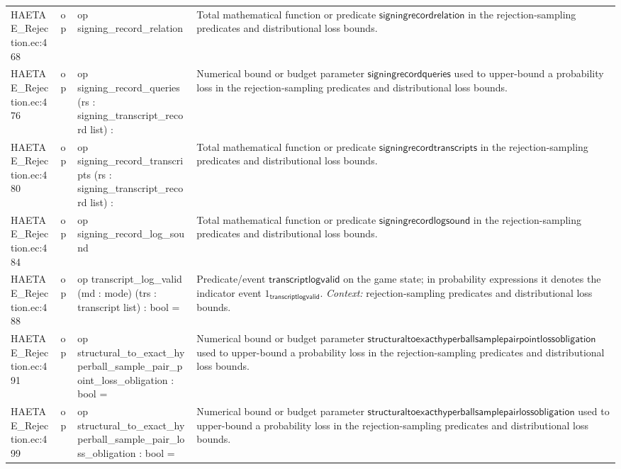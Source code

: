 \documentclass[10pt]{article}
\begin{document}
\begin{longtable}{L{0.11\textwidth}L{0.055\textwidth}L{0.385\textwidth}L{0.41\textwidth}}
HAETAE\_\allowbreak{}Rejection.\allowbreak{}ec:\allowbreak{}468 & op & {\ttfamily\scriptsize op signing\_\allowbreak{}record\_\allowbreak{}relation} & Total mathematical function or predicate $\mathsf{signingrecordrelation}$ in the rejection-sampling predicates and distributional loss bounds. \\
HAETAE\_\allowbreak{}Rejection.\allowbreak{}ec:\allowbreak{}476 & op & {\ttfamily\scriptsize op signing\_\allowbreak{}record\_\allowbreak{}queries (rs : signing\_\allowbreak{}transcript\_\allowbreak{}record list) :} & Numerical bound or budget parameter $\mathsf{signingrecordqueries}$ used to upper-bound a probability loss in the rejection-sampling predicates and distributional loss bounds. \\
HAETAE\_\allowbreak{}Rejection.\allowbreak{}ec:\allowbreak{}480 & op & {\ttfamily\scriptsize op signing\_\allowbreak{}record\_\allowbreak{}transcripts (rs : signing\_\allowbreak{}transcript\_\allowbreak{}record list) :} & Total mathematical function or predicate $\mathsf{signingrecordtranscripts}$ in the rejection-sampling predicates and distributional loss bounds. \\
HAETAE\_\allowbreak{}Rejection.\allowbreak{}ec:\allowbreak{}484 & op & {\ttfamily\scriptsize op signing\_\allowbreak{}record\_\allowbreak{}log\_\allowbreak{}sound} & Total mathematical function or predicate $\mathsf{signingrecordlogsound}$ in the rejection-sampling predicates and distributional loss bounds. \\
HAETAE\_\allowbreak{}Rejection.\allowbreak{}ec:\allowbreak{}488 & op & {\ttfamily\scriptsize op transcript\_\allowbreak{}log\_\allowbreak{}valid (md : mode) (trs : transcript list) : bool =} & Predicate/event $\mathsf{transcriptlogvalid}$ on the game state; in probability expressions it denotes the indicator event $1_{\mathsf{transcriptlogvalid}}$. \emph{Context:} rejection-sampling predicates and distributional loss bounds. \\
HAETAE\_\allowbreak{}Rejection.\allowbreak{}ec:\allowbreak{}491 & op & {\ttfamily\scriptsize op structural\_\allowbreak{}to\_\allowbreak{}exact\_\allowbreak{}hyperball\_\allowbreak{}sample\_\allowbreak{}pair\_\allowbreak{}point\_\allowbreak{}loss\_\allowbreak{}obligation : bool =} & Numerical bound or budget parameter $\mathsf{structuraltoexacthyperballsamplepairpointlossobligation}$ used to upper-bound a probability loss in the rejection-sampling predicates and distributional loss bounds. \\
HAETAE\_\allowbreak{}Rejection.\allowbreak{}ec:\allowbreak{}499 & op & {\ttfamily\scriptsize op structural\_\allowbreak{}to\_\allowbreak{}exact\_\allowbreak{}hyperball\_\allowbreak{}sample\_\allowbreak{}pair\_\allowbreak{}loss\_\allowbreak{}obligation : bool =} & Numerical bound or budget parameter $\mathsf{structuraltoexacthyperballsamplepairlossobligation}$ used to upper-bound a probability loss in the rejection-sampling predicates and distributional loss bounds. \\

\end{longtable}
\end{document}
